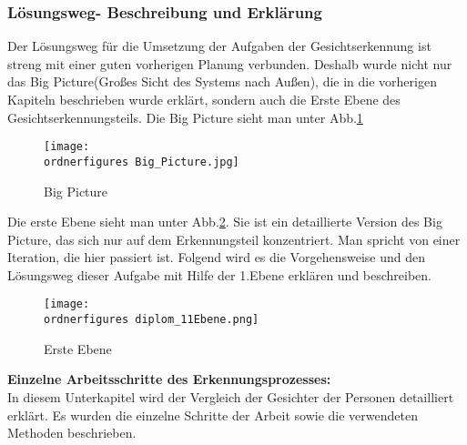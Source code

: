 \subsubsection{Lösungsweg- Beschreibung und Erklärung}
Der Lösungsweg für die Umsetzung der Aufgaben der Gesichtserkennung ist streng mit einer guten vorherigen Planung verbunden. Deshalb wurde nicht nur das Big Picture(Großes Sicht des Systems nach Außen), die in die vorherigen Kapiteln beschrieben wurde erklärt, sondern auch die Erste Ebene des Gesichtserkennungsteils.
Die Big Picture sieht man unter Abb.\ref{fig:Big Picture}

\begin{figure}[H]
	\texttt{[image: \\ordnerfigures Big\_Picture.jpg]}
	\caption{Big Picture}
	\label{fig:Big Picture}
\end{figure}	
Die erste Ebene sieht man unter Abb.\ref{fig:Erste Ebene}. Sie ist ein detaillierte Version des Big Picture, das sich nur auf dem Erkennungsteil konzentriert. Man spricht von einer Iteration, die hier passiert ist.  Folgend wird es die Vorgehensweise und den Lösungsweg dieser Aufgabe mit Hilfe der 1.Ebene erklären und beschreiben.\\

\begin{figure}[H]
	\texttt{[image: \\ordnerfigures diplom\_11Ebene.png]}
	\caption{Erste Ebene}
	\label{fig:Erste Ebene}
\end{figure}

\textbf{Einzelne Arbeitsschritte des Erkennungsprozesses: }\\

In diesem Unterkapitel wird der Vergleich der Gesichter der Personen detailliert erklärt. Es wurden die einzelne Schritte der Arbeit sowie die verwendeten Methoden beschrieben.

